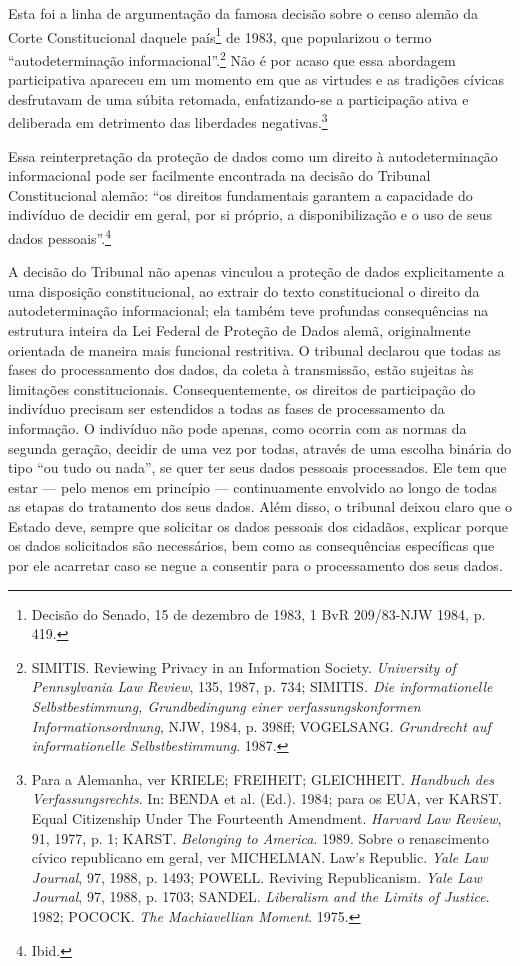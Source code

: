 Esta foi a linha de argumentação da famosa decisão sobre o censo alemão
da Corte Constitucional daquele país\footnote{Decisão do Senado, 15 de
  dezembro de 1983, 1 BvR 209/83-NJW 1984, p. 419.} de 1983, que
popularizou o termo ``autodeterminação informacional''.\footnote{SIMITIS.
  Reviewing Privacy in an Information Society. \emph{University of
  Pennsylvania Law Review}, 135, 1987, p. 734; SIMITIS\emph{. Die
  informationelle Selbstbestimmung, Grundbedingung einer
  verfassungskonformen Informationsordnung}, NJW, 1984, p. 398ff;
  VOGELSANG. \emph{Grundrecht auf informationelle Selbstbestimmung}.
  1987.} Não é por acaso que essa abordagem participativa apareceu em um
momento em que as virtudes e as tradições cívicas desfrutavam de uma
súbita retomada, enfatizando-se a participação ativa e deliberada em
detrimento das liberdades negativas.\footnote{Para a Alemanha, ver
  KRIELE; FREIHEIT; GLEICHHEIT. \emph{Handbuch des Verfassungsrechts}.
  In: BENDA et al. (Ed.). 1984; para os EUA, ver KARST. Equal
  Citizenship Under The Fourteenth Amendment. \emph{Harvard Law Review},
  91, 1977, p. 1; KARST. \emph{Belonging to America}. 1989. Sobre o
  renascimento cívico republicano em geral, ver MICHELMAN. Law's
  Republic. \emph{Yale Law Journal}, 97, 1988, p. 1493; POWELL. Reviving
  Republicanism. \emph{Yale Law Journal}, 97, 1988, p. 1703; SANDEL.
  \emph{Liberalism and the Limits of Justice}. 1982; POCOCK. \emph{The
  Machiavellian Moment}. 1975.}

Essa reinterpretação da proteção de dados como um direito à
autodeterminação informacional pode ser facilmente encontrada na decisão
do Tribunal Constitucional alemão: ``os direitos fundamentais garantem a
capacidade do indivíduo de decidir em geral, por si próprio, a
disponibilização e o uso de seus dados pessoais''.\footnote{Ibid.}

A decisão do Tribunal não apenas vinculou a proteção de dados
explicitamente a uma disposição constitucional, ao extrair do texto
constitucional o direito da autodeterminação informacional; ela também
teve profundas consequências na estrutura inteira da Lei Federal de
Proteção de Dados alemã, originalmente orientada de maneira mais
funcional restritiva. O tribunal declarou que todas as fases do
processamento dos dados, da coleta à transmissão, estão sujeitas às
limitações constitucionais. Consequentemente, os direitos de
participação do indivíduo precisam ser estendidos a todas as fases de
processamento da informação. O indivíduo não pode apenas, como ocorria
com as normas da segunda geração, decidir de uma vez por todas, através
de uma escolha binária do tipo ``ou tudo ou nada'', se quer ter seus
dados pessoais processados. Ele tem que estar --- pelo menos em
princípio --- continuamente envolvido ao longo de todas as etapas do
tratamento dos seus dados. Além disso, o tribunal deixou claro que o
Estado deve, sempre que solicitar os dados pessoais dos cidadãos,
explicar porque os dados solicitados são necessários, bem como as
consequências específicas que por ele acarretar caso se negue a
consentir para o processamento dos seus dados.

